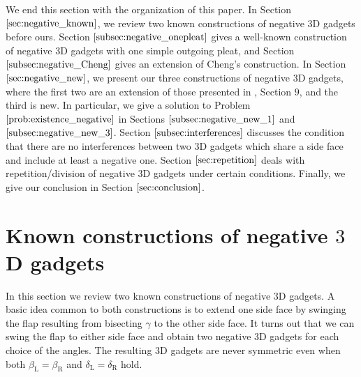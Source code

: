 \documentclass[11pt]{amsart}
\numberwithin{equation}{section}
\numberwithin{theorem}{section}
\newcommand{\Lt}{\ensuremath{\mathrm{L}}}
\newcommand{\Rt}{\ensuremath{\mathrm{R}}}
\begin{document}
We end this section with the organization of this paper.
In Section $\ref{sec:negative_known}$, we review two known constructions of negative $3$D gadgets before ours.
Section $\ref{subsec:negative_onepleat}$ gives a well-known construction of negative $3$D gadgets with one simple outgoing pleat,
and Section $\ref{subsec:negative_Cheng}$ gives an extension of Cheng's construction.
In Section $\ref{sec:negative_new}$, we present our three constructions of negative $3$D gadgets,
where the first two are an extension of those presented in \cite{Doi19}, Section $9$, and the third is new.
In particular, we give a solution to Problem $\ref{prob:existence_negative}$ in Sections $\ref{subsec:negative_new_1}$ and $\ref{subsec:negative_new_3}$.
Section $\ref{subsec:interferences}$ discusses the condition that there are no interferences between two $3$D gadgets
which share a side face and include at least a negative one.
Section $\ref{sec:repetition}$ deals with repetition/division of negative $3$D gadgets under certain conditions.
Finally, we give our conclusion in Section $\ref{sec:conclusion}$.

\section{Known constructions of negative $3$D gadgets}\label{sec:negative_known}
In this section we review two known constructions of negative $3$D gadgets.
A basic idea common to both constructions is to extend one side face by swinging the flap resulting from bisecting $\gamma$ to the other side face.
It turns out that we can swing the flap to either side face and obtain two negative $3$D gadgets for each choice of the angles.
The resulting $3$D gadgets are never symmetric even when both $\beta_\Lt =\beta_\Rt$ and $\delta_\Lt =\delta_\Rt$ hold.
\end{document}
